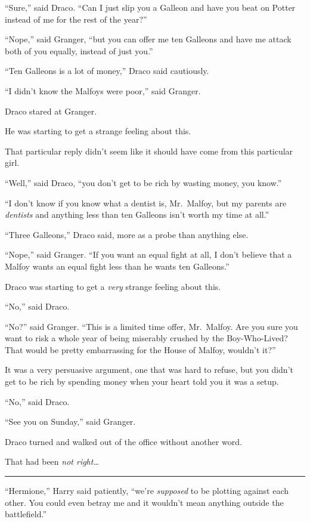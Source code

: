 ``Sure,'' said Draco. ``Can I just slip you a Galleon and have you beat
on Potter instead of me for the rest of the year?''

``Nope,'' said Granger, ``but you can offer me ten Galleons and have me
attack both of you equally, instead of just you.''

``Ten Galleons is a lot of money,'' Draco said cautiously.

``I didn't know the Malfoys were poor,'' said Granger.

Draco stared at Granger.

He was starting to get a strange feeling about this.

That particular reply didn't seem like it should have come from this
particular girl.

``Well,'' said Draco, ``you don't get to be rich by wasting money, you
know.''

``I don't know if you know what a dentist is, Mr.~Malfoy, but my parents
are \emph{dentists} and anything less than ten Galleons isn't worth my
time at all.''

``Three Galleons,'' Draco said, more as a probe than anything else.

``Nope,'' said Granger. ``If you want an equal fight at all, I don't
believe that a Malfoy wants an equal fight less than he wants ten
Galleons.''

Draco was starting to get a \emph{very} strange feeling about this.

``No,'' said Draco.

``No?'' said Granger. ``This is a limited time offer, Mr.~Malfoy. Are
you sure you want to risk a whole year of being miserably crushed by the
Boy-Who-Lived? That would be pretty embarrassing for the House of
Malfoy, wouldn't it?''

It was a very persuasive argument, one that was hard to refuse, but you
didn't get to be rich by spending money when your heart told you it was
a setup.

``No,'' said Draco.

``See you on Sunday,'' said Granger.

Draco turned and walked out of the office without another word.

That had been \emph{not right\ldots{}}

\begin{center}\rule{3in}{0.4pt}\end{center}

``Hermione,'' Harry said patiently, ``we're \emph{supposed} to be
plotting against each other. You could even betray me and it wouldn't
mean anything outside the battlefield.''

